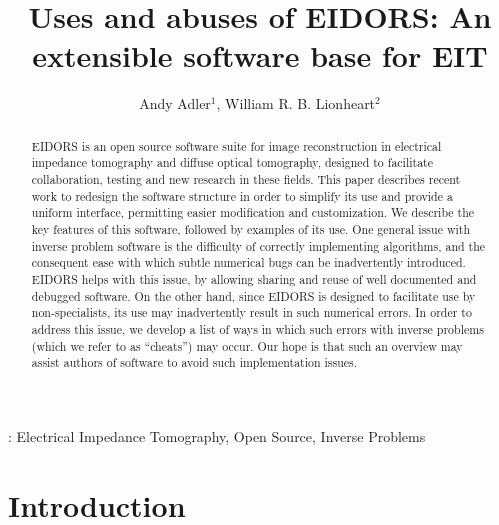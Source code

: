 \documentclass[12pt]{iopart}
\begin{document}
\title{Uses and abuses of EIDORS: An extensible software base for EIT}
\author{Andy Adler$^1$, William R. B. Lionheart$^2$}
\address{$^1$ School of Information Technology and Engineering,
              University of Ottawa, Canada}
\address{$^2$ School of Mathematics, University of Manchester, U.K.}

\begin{abstract} %

EIDORS is an open source software suite for image reconstruction in
electrical impedance tomography and diffuse optical tomography,
designed to facilitate collaboration, testing and new research
in these fields.  This paper describes recent work to
redesign the software structure in order to simplify its use
and provide a uniform interface,
permitting easier modification and customization.
We describe the key features of this software, followed by
examples of its use.
One general issue with inverse problem software is the difficulty
of correctly implementing algorithms, and the consequent ease with
which subtle numerical bugs can be inadvertently introduced.
EIDORS helps with this issue, by allowing sharing and reuse
of well documented and debugged software. On the other hand, 
since EIDORS is designed to facilitate use by non-specialists,
its use may inadvertently result in such numerical errors.
In order to address this issue, we develop a list of ways in
which such errors with inverse problems
 (which we refer to as ``cheats'') may occur.
Our hope is that such an overview may assist authors
of software to avoid such implementation issues.


\end{abstract}
:
Electrical Impedance Tomography,
Open Source,
Inverse Problems

\section{Introduction}
\end{document}
